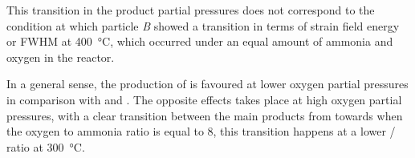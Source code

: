 This transition in the product partial pressures does not correspond to the condition at which particle \textit{B} showed a transition in terms of strain field energy or FWHM at \qty{400}{\degreeCelsius}, which occurred under an equal amount of ammonia and oxygen in the reactor.

In a general sense, the production of  is favoured at lower oxygen partial pressures in comparison with  and .
The opposite effects takes place at high oxygen partial pressures, with a clear transition between the main products from  towards  when the oxygen to ammonia ratio is equal to 8, this transition happens at a lower / ratio at \qty{300}{\degreeCelsius}.
